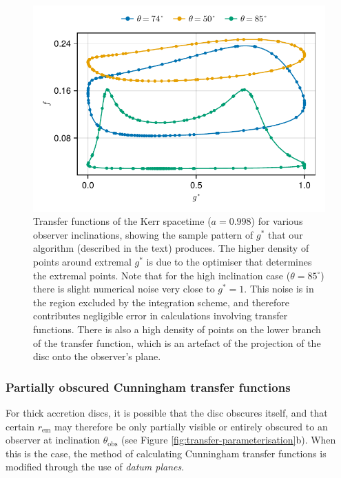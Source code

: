 \documentclass[fleqn,usenatbib]{mnras}
\newcommand{\rhoem}{r_\text{em}}
\begin{document}
\begin{figure}
    \centering
    \includegraphics[width=0.95\columnwidth]{figures/transfer-functions.sampling.pdf}
    \caption{Transfer functions of the Kerr spacetime ($a = 0.998$) for various
        observer inclinations, showing the sample pattern of $g^\ast$ that our
        algorithm (described in the text) produces. The higher density of points
        around extremal $g^\ast$ is due to the optimiser
        that determines the extremal points. Note that for the high inclination
        case ($\theta = 85^\circ$) there is slight numerical noise very close to
        $g^\ast = 1$. This noise is in the region excluded by the integration
        scheme, and therefore contributes negligible error in calculations
        involving transfer functions. There is also a high density of points on
        the lower branch of the transfer function, which is an artefact of the
        projection of the disc onto the observer's plane.
    }
    \label{fig:transfer-sampling-pattern}
\end{figure}

\subsubsection{Partially obscured Cunningham transfer functions}
\label{sec:partially-obscured-functions}

For thick accretion discs, it is possible that the disc obscures itself, and
that certain $\rhoem$ may therefore be only partially visible or entirely
obscured to an observer at inclination $\theta_\text{obs}$ (see Figure
\ref{fig:transfer-parameterisation}b). When this is the case, the method of
calculating Cunningham transfer functions is modified through the use of
\emph{datum planes}.
\end{document}
